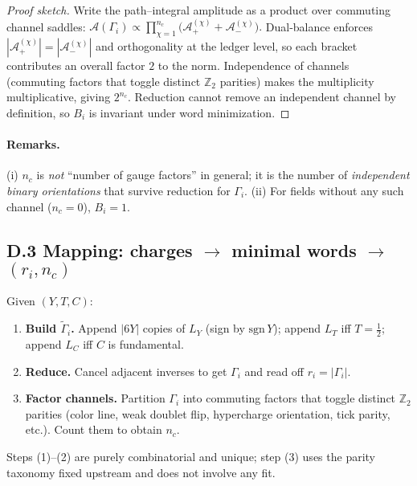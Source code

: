 \documentclass[11pt]{article}
\begin{document}
\begin{proposition}
\begin{proof}[Proof sketch]
Write the path–integral amplitude as a product over commuting channel saddles:
\(
\mathcal A(\Gamma_i)\propto \prod_{\chi=1}^{n_c}\bigl(\mathcal A^{(\chi)}_{+}+\mathcal A^{(\chi)}_{-}\bigr).
\)
Dual‑balance enforces \(|\mathcal A^{(\chi)}_{+}|=|\mathcal A^{(\chi)}_{-}|\) and orthogonality at the ledger level, so each bracket contributes an overall factor \(2\) to the norm. Independence of channels (commuting factors that toggle distinct \(\mathbb Z_2\) parities) makes the multiplicity multiplicative, giving \(2^{n_c}\). Reduction cannot remove an independent channel by definition, so \(B_i\) is invariant under word minimization.%
\end{proof}

\paragraph{Remarks.}
(i) \(n_c\) is \emph{not} ``number of gauge factors'' in general; it is the number of \emph{independent binary orientations} that survive reduction for \(\Gamma_i\).
(ii) For fields without any such channel (\(n_c=0\)), \(B_i=1\).

\subsection*{D.3  Mapping: charges \(\to\) minimal words \(\to\) \((r_i,n_c)\)}
Given \((Y,T,C)\):
\begin{enumerate}
\item \textbf{Build \(\widetilde\Gamma_i\).} Append \(|6Y|\) copies of \(L_Y\) (sign by \(\mathrm{sgn}\,Y\)); append \(L_T\) iff \(T=\tfrac12\); append \(L_C\) iff \(C\) is fundamental.
\item \textbf{Reduce.} Cancel adjacent inverses to get \(\Gamma_i\) and read off \(r_i=|\Gamma_i|\).
\item \textbf{Factor channels.} Partition \(\Gamma_i\) into commuting factors that toggle distinct \(\mathbb Z_2\) parities (color line, weak doublet flip, hypercharge orientation, tick parity, etc.). Count them to obtain \(n_c\).
\end{enumerate}
Steps (1)–(2) are purely combinatorial and unique; step (3) uses the parity taxonomy fixed upstream and does not involve any fit.%


\end{proposition}
\end{document}
